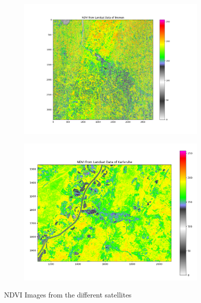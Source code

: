 \begin{figure}[!htbp]
    \centering
    \begin{subfigure}{0.45\textwidth}
    \includegraphics[width=\textwidth]{img/NDVI_LE07_L1TP_196023_20190723_20200825_02_T1__Bremen.png}
    \end{subfigure}
    \begin{subfigure}{0.45\textwidth}
    \includegraphics[width=\textwidth]{img/KarlsruheNDVI_Landsat8.png} 
    \end{subfigure}
    \caption{NDVI Images from the different satellites\label{fig:ndvi}}
\end{figure}
